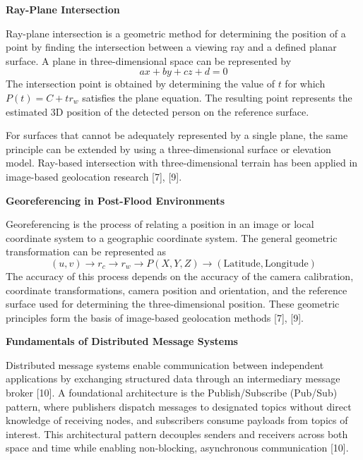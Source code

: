 \documentclass[12pt]{article}
\newcommand{\infofont}{\fontsize{16pt}{19.2pt}\selectfont}
\newcommand{\MinorHead}[1]{\vspace{0.6em}\noindent{\infofont\bfseries #1}\vspace{0.2em}\par}
\begin{document}
\textbf{\infofont Ray-Plane Intersection}\par
\infofont
Ray-plane intersection is a geometric method for determining the position of a point by
finding the intersection between a viewing ray and a defined planar surface. A plane in
three-dimensional space can be represented by
\begin{equation}
ax + by + cz + d = 0
\end{equation}
The intersection point is obtained by determining the value of $t$ for which $P(t) = C + t r_w$
satisfies the plane equation. The resulting point represents the estimated 3D position of the
detected person on the reference surface.

For surfaces that cannot be adequately represented by a single plane, the same
principle can be extended by using a three-dimensional surface or elevation model.
Ray-based intersection with three-dimensional terrain has been applied in image-based
geolocation research [7], [9].

\textbf{\infofont Georeferencing in Post-Flood Environments}\par
\infofont
Georeferencing is the process of relating a position in an image or local coordinate
system to a geographic coordinate system. The general geometric transformation can be
represented as
\begin{equation}
(u,v) \rightarrow r_c \rightarrow r_w \rightarrow P(X,Y,Z) \rightarrow (\text{Latitude}, \text{Longitude})
\end{equation}
The accuracy of this process depends on the accuracy of the camera calibration,
coordinate transformations, camera position and orientation, and the reference surface used
for determining the three-dimensional position. These geometric principles form the basis of
image-based geolocation methods [7], [9].

\MinorHead{2.1.2.4 Distributed Data Streaming}

\textbf{\infofont Fundamentals of Distributed Message Systems}\par
\infofont
Distributed message systems enable communication between independent applications
by exchanging structured data through an intermediary message broker [10]. A foundational
architecture is the Publish/Subscribe (Pub/Sub) pattern, where publishers dispatch messages
to designated topics without direct knowledge of receiving nodes, and subscribers consume
payloads from topics of interest. This architectural pattern decouples senders and receivers
across both space and time while enabling non-blocking, asynchronous communication [10].
\end{document}
